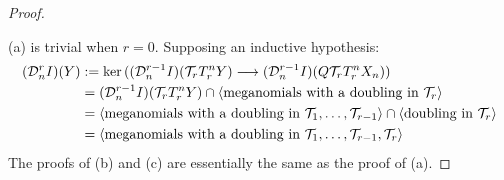 \documentclass[10pt]{article}
\newcommand{\caldup}[1]{\calD^{\smash{#1}}}
\newcommand{\caldupdown}[2]{\calD^{\smash{#1}}_{\smash{#2}}}
\newcommand{\Comm}{\calC}
\begin{document}
\begin{convergence}
\begin{proof}
\begin{enumerate}
\end{enumerate}
(a) is trivial when $r=0$. Supposing an inductive hypothesis:
\begin{alignat*}{2}
(\caldupdown{r}{n}I)(Y)
&:=
\ker((\caldupdown{r-1}{n}I)(\calT_r T_r^n Y)\to (\caldupdown{r-1}{n}I) (Q\calT_rT_r^n X_n))%
\\
&=
(\caldupdown{r-1}{n}I)(\calT_r T_r^n Y)\cap\langle \textup{meganomials with a doubling in $\calT_r$}\rangle\\
&=
\langle \textup{meganomials with a doubling in $\calT_1,\ldots,\calT_{r-1}$}\rangle\cap\langle \textup{doubling in $\calT_r$}\rangle\\
&=
\langle \textup{meganomials with a doubling in $\calT_1,\ldots,\calT_{r-1},\calT_{r}$}\rangle
\end{alignat*}
The proofs of (b) and (c) are essentially the same as the proof of (a).
\end{proof}





\end{convergence}
\end{document}
